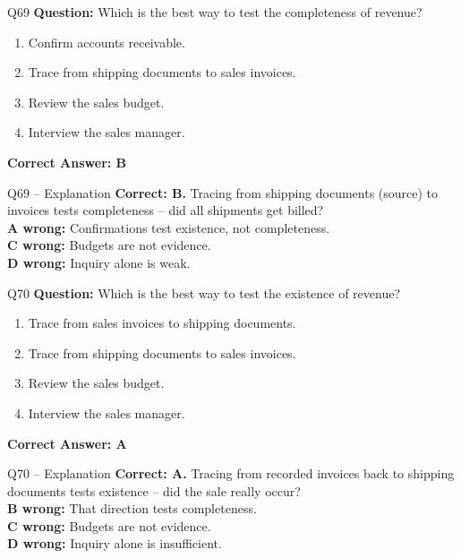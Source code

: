 \documentclass[aspectratio=169,10pt]{beamer}
\begin{document}
	\begin{frame}[t]{Q69}
		\small
		\textbf{Question:} Which is the best way to test the completeness of revenue?
		\begin{enumerate}[label=\Alph*.,itemsep=1pt,topsep=2pt]
			\item Confirm accounts receivable.
			\item Trace from shipping documents to sales invoices.
			\item Review the sales budget.
			\item Interview the sales manager.
		\end{enumerate}
		\vspace{4pt}
		\textbf{Correct Answer: B}
	\end{frame}
	
	\begin{frame}[t]{Q69 -- Explanation}
		\small
		\textbf{Correct: B.} Tracing from shipping documents (source) to invoices tests completeness -- did all shipments get billed? \\[4pt]
		\textbf{A wrong:} Confirmations test existence, not completeness. \\[2pt]
		\textbf{C wrong:} Budgets are not evidence. \\[2pt]
		\textbf{D wrong:} Inquiry alone is weak.
	\end{frame}
	
	\begin{frame}[t]{Q70}
		\small
		\textbf{Question:} Which is the best way to test the existence of revenue?
		\begin{enumerate}[label=\Alph*.,itemsep=1pt,topsep=2pt]
			\item Trace from sales invoices to shipping documents.
			\item Trace from shipping documents to sales invoices.
			\item Review the sales budget.
			\item Interview the sales manager.
		\end{enumerate}
		\vspace{4pt}
		\textbf{Correct Answer: A}
	\end{frame}
	
	\begin{frame}[t]{Q70 -- Explanation}
		\small
		\textbf{Correct: A.} Tracing from recorded invoices back to shipping documents tests existence -- did the sale really occur? \\[4pt]
		\textbf{B wrong:} That direction tests completeness. \\[2pt]
		\textbf{C wrong:} Budgets are not evidence. \\[2pt]
		\textbf{D wrong:} Inquiry alone is insufficient.
	\end{frame}
	
\end{document}
